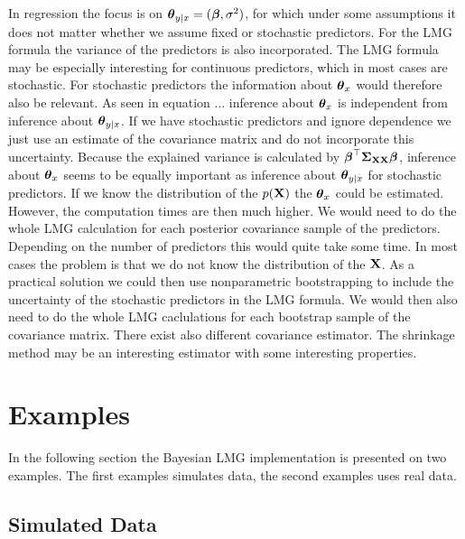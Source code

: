 \documentclass[11pt,a4paper,twoside]{book}\usepackage[]{graphicx}\usepackage[]{color}
\begin{document}
  In regression the focus is on ${\boldsymbol{\theta}}{}_{y \mid x} = ({\boldsymbol{\beta}}, \sigma^2)$, for which under some assumptions it does not matter whether we assume fixed or stochastic predictors. For the LMG formula the variance of the predictors is also incorporated. The LMG formula may be especially interesting for continuous predictors, which in most cases are stochastic. For stochastic predictors the information about ${\boldsymbol{\theta}}{}_{x}$ would therefore also be relevant.  As seen in equation ... inference about ${\boldsymbol{\theta}}{}_{x}$  is independent from inference about ${\boldsymbol{\theta}}{}_{y \mid x}$. If we have stochastic predictors and ignore dependence we just use an estimate of the covariance matrix and do not incorporate this uncertainty.  Because the explained variance is calculated by ${\boldsymbol{\beta}}^\top {\boldsymbol{\Sigma}}{}_{{\mathbf{X}} {\mathbf{X}}}  {\boldsymbol{\beta}}$, inference about  ${\boldsymbol{\theta}}{}_{x}$  seems to be equally important as inference about ${\boldsymbol{\theta}}{}_{y \mid x}$ for stochastic predictors. If we know the distribution of the $p({\mathbf{X}})$ the ${\boldsymbol{\theta}}{}_{x}$ could be estimated. However, the computation times are then much higher. We would need to do the whole LMG calculation for each posterior covariance sample of the predictors. Depending on the number of predictors this would quite take some time.  In most cases the problem is that we do not know the distribution of the ${\mathbf{X}}$. As a practical solution we could then use nonparametric bootstrapping to include the uncertainty of the stochastic predictors in the LMG formula. We would then also need to do the whole LMG caclulations for each bootstrap sample of the covariance matrix. There exist also different covariance estimator. The shrinkage method may be an interesting estimator with some interesting properties. 
  
  
  
 









\chapter{Examples}

In the following section the Bayesian LMG implementation is presented on two examples. The first examples simulates data, the second examples uses real data.

\section{Simulated Data}
\end{document}
